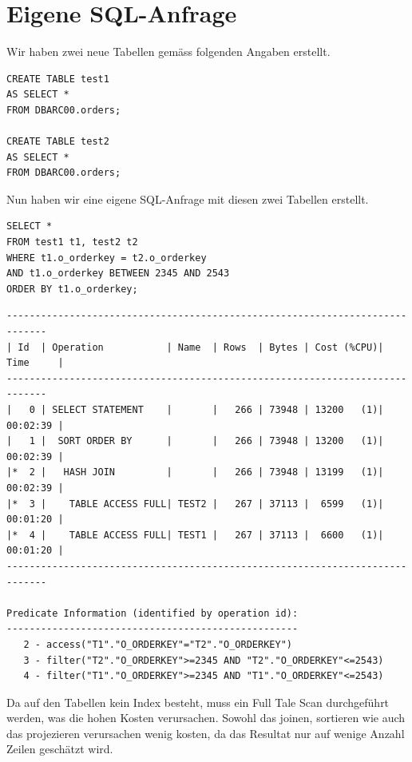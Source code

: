 \documentclass[10pt]{article}
\begin{document}
\section{Eigene SQL-Anfrage}
Wir haben zwei neue Tabellen gemäss folgenden Angaben erstellt.
\begin{lstlisting}[style=sql]
CREATE TABLE test1
AS SELECT *
FROM DBARC00.orders;

CREATE TABLE test2
AS SELECT *
FROM DBARC00.orders;
\end{lstlisting}
Nun haben wir eine eigene SQL-Anfrage mit diesen zwei Tabellen erstellt.
\begin{lstlisting}[style=sql]
SELECT *
FROM test1 t1, test2 t2
WHERE t1.o_orderkey = t2.o_orderkey
AND t1.o_orderkey BETWEEN 2345 AND 2543
ORDER BY t1.o_orderkey;
\end{lstlisting}
\begin{lstlisting}[style=queryexecutionplan]
-----------------------------------------------------------------------------
| Id  | Operation           | Name  | Rows  | Bytes | Cost (%CPU)| Time     |
-----------------------------------------------------------------------------
|   0 | SELECT STATEMENT    |       |   266 | 73948 | 13200   (1)| 00:02:39 |
|   1 |  SORT ORDER BY      |       |   266 | 73948 | 13200   (1)| 00:02:39 |
|*  2 |   HASH JOIN         |       |   266 | 73948 | 13199   (1)| 00:02:39 |
|*  3 |    TABLE ACCESS FULL| TEST2 |   267 | 37113 |  6599   (1)| 00:01:20 |
|*  4 |    TABLE ACCESS FULL| TEST1 |   267 | 37113 |  6600   (1)| 00:01:20 |
-----------------------------------------------------------------------------
 
Predicate Information (identified by operation id):
---------------------------------------------------
   2 - access("T1"."O_ORDERKEY"="T2"."O_ORDERKEY")
   3 - filter("T2"."O_ORDERKEY">=2345 AND "T2"."O_ORDERKEY"<=2543)
   4 - filter("T1"."O_ORDERKEY">=2345 AND "T1"."O_ORDERKEY"<=2543)
\end{lstlisting}
Da auf den Tabellen kein Index besteht, muss ein Full Tale Scan durchgeführt werden, 
was die hohen Kosten verursachen. Sowohl das joinen, sortieren wie auch das projezieren 
verursachen wenig kosten, da das Resultat nur auf wenige Anzahl Zeilen geschätzt wird.
\end{document}
